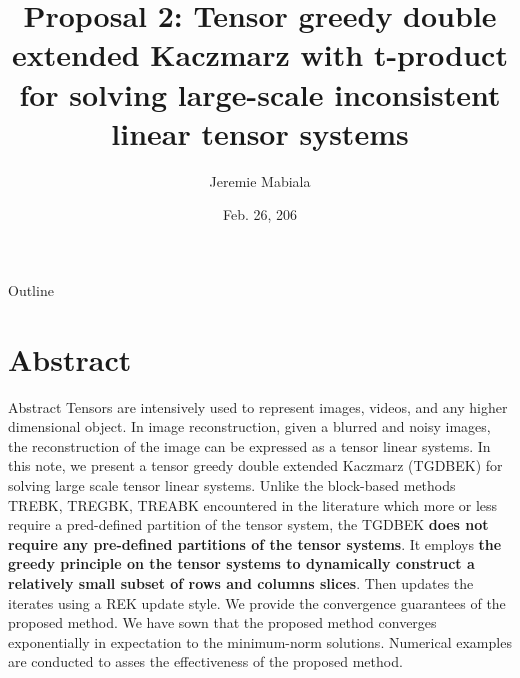 \documentclass[aspectratio=169]{beamer}
\title[TGDBEK]{Proposal 2: Tensor greedy double extended Kaczmarz with t-product for solving large-scale inconsistent linear tensor systems}
\author[Jeremie Mabiala]{Jeremie Mabiala}
\institute[AIMS Senegal]{%
AIMS Senegal
}
\date{Feb. 26, 206} %
\begin{document}

\begin{frame}
  \titlepage
\end{frame}

\begin{frame}{Outline}
  \tableofcontents
\end{frame}

\section{Abstract}
\begin{frame}{Abstract}
Tensors are intensively used to represent images, videos, and any higher dimensional object. In image reconstruction, given a blurred and noisy images, the reconstruction of the image can be expressed as a tensor linear systems. In this note, we present a tensor greedy double extended Kaczmarz (TGDBEK) for solving large scale tensor linear systems. Unlike the block-based methods TREBK, TREGBK, TREABK encountered in the literature which more or less require a pred-defined partition of the tensor system, the TGDBEK \textbf{does not require any pre-defined partitions of the tensor systems}. It employs \textbf{the greedy principle on the tensor systems to dynamically construct a relatively small subset of rows and columns slices}. Then updates the iterates  using  a REK update style.  We provide the convergence guarantees of the proposed method. We have sown that the proposed method converges exponentially in expectation to the minimum-norm solutions. Numerical examples are conducted to asses the effectiveness of the proposed method.
\end{frame}
\end{document}
